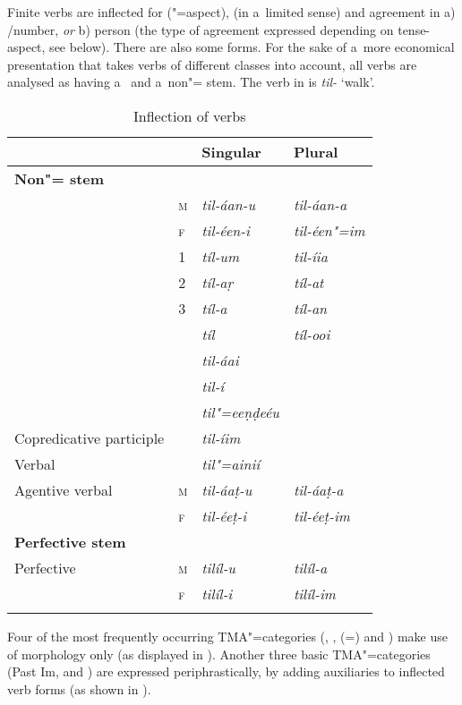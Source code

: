 Finite verbs are inflected for ("=aspect),  (in a~limited sense) and agreement in a)
/number, \textit{or} b) person (the type of agreement expressed depending on tense-aspect, see 
below). There are also some  forms. For the sake of a~more economical presentation that
takes verbs of different  classes into account, all verbs are analysed as having
a~ and a~non"= stem. The verb in  is \textit{til-} `walk'.


\begin{table}[ht]
\caption{Inflection of verbs}
\begin{tabularx}{\textwidth}{ l l Q Q }
\lsptoprule
&
&
Singular &
Plural \\\hline
\textbf{Non"= stem} &
&
&
\\
 &
\textsc{m} &
\textit{til-áan-u} &
\textit{til-áan-a} \\
&
\textsc{f} &
\textit{til-éen-i} &
\textit{til-éen"=im} \\
 &
1 &
\textit{tíl-um} &
\textit{til-íia} \\
&
2 &
\textit{tíl-aṛ} &
\textit{tíl-at} \\
&
3 &
\textit{tíl-a} &
\textit{tíl-an} \\
 &
&
\textit{tíl} &
\textit{tíl-ooi} \\
 &
&
\textit{til-áai} &
\\
 &
&
\textit{til-í} &
\\
 &
&
\textit{til"=eeṇḍeéu} &
\\
Copredicative participle &
&
\textit{til-íim} &
\\
Verbal  &
&
\textit{til"=ainií} &
\\
Agentive verbal  &
\textsc{m} &
\textit{til-áaṭ-u} &
\textit{til-áaṭ-a} \\
&
\textsc{f} &
\textit{til-éeṭ-i} &
\textit{til-éeṭ-im} \\
\textbf{Perfective stem} &
&
&
\\
Perfective &
\textsc{m} &
\textit{tilíl-u} &
\textit{tilíl-a} \\
&
\textsc{f} &
\textit{tilíl-i} &
\textit{tilíl-im} \\\lspbottomrule
\end{tabularx}
\label{tab:2-verb}
\end{table}


Four of the most frequently occurring TMA"=categories (, ,  (=) and ) make use of  morphology only (as displayed in ). Another three basic TMA"=categories (Past Im,  and ) are expressed periphrastically, by adding auxiliaries to inflected verb forms (as shown in ).


